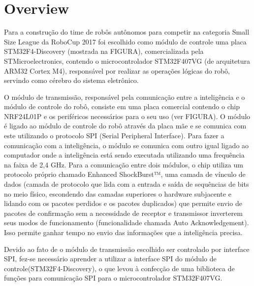 \chapter{Overview}\label{cap:overview}

Para a construção do time de robôs autônomos para competir na categoria Small Size League da RoboCup 2017 foi escolhido como módulo de controle uma placa STM32F4-Discovery (mostrada na FIGURA), comercializada pela STMicroelectronics, contendo o microcontrolador STM32F407VG (de arquitetura ARM32 Cortex M4), responsável por realizar as operações lógicas do robô, servindo como cérebro do sistema eletrônico.

O módulo de transmissão, responsável pela comunicação entre a inteligência e o módulo de controle do robô, consiste em uma placa comercial contendo o chip NRF24L01P e os periféricos necessários para o seu uso (ver FIGURA). O módulo é ligado ao módulo de controle do robô através da placa mãe e se comunica com este utilizando o protocolo SPI (Serial Peripheral Interface). Para fazer a comunicação com a inteligência, o módulo se comunica com outro igual ligado ao computador onde a inteligência está sendo executada utilizando uma frequência na faixa de 2,4 GHz. Para a comunicação entre dois módulos, o chip utiliza um protocolo próprio chamado Enhanced ShockBurst™, uma camada de vínculo de dados (camada de protocolo que lida com a entrada e saída de sequências de bits no meio físico, escondendo das camadas superiores o hardware subjacente e lidando com os pacotes perdidos e os pacotes duplicados) que permite envio de pacotes de confirmação sem a necessidade de receptor e transmissor inverterem seus modos de funcionamento (funcionalidade chamada Auto Acknowledgement).
Isso permite ganhar tempo no envio das informações que a inteligência precisa.

Devido ao fato de o módulo de transmissão escolhido ser controlado por interface SPI, fez-se necessário aprender a utilizar a interface SPI do módulo de controle(STM32F4-Discovery), o que levou à confecção de uma  biblioteca de funções para comunicação SPI para o microcontrolador STM32F407VG.


